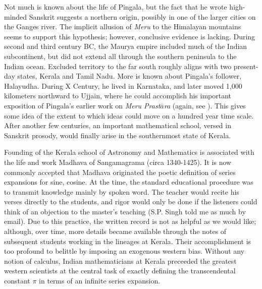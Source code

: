 \documentclass[nofootinbib,preprint]{revtex4-1}
\begin{document}
Not much is known about the life of Pingala, but the fact that he wrote high-minded Sanskrit suggests 
a northern origin, possibly in one of the larger cities on the Ganges river. The implicit
allusion of \textit{Meru} to the Himalayan mountains seems to support this hypothesis; however, 
conclusive evidence is lacking. During second and third century BC, the Maurya empire included 
much of the Indian subcontinent, but did not extend all through the southern peninsula to the 
Indian ocean. Excluded territory to the far south roughly aligns with two present-day states, 
Kerala and Tamil Nadu. More is known about Pingala's follower, Halayudha. During X Century, he 
lived in Karnataka, and later moved 1,000 kilometers northward to Ujjain, where he could accomplish 
his important exposition of Pingala's earlier work on \textit{Meru Prast$\bar{a}$ra} 
(again, see \cite{SINGH1936}). 
This gives  some idea of the extent to which ideas could move on a hundred year time scale. After another 
few centuries, an important mathematical school, versed in Sanskrit prosody, would finally 
arise in the southernmost state of Kerala.

Founding of the Kerala school of Astronomy and Mathematics is associated with the life and
work Madhava of Sangamagrama (circa 1340-1425). It is now commonly accepted that Madhava originated 
the poetic definition of series expansions for sine, cosine\cite{ROY1990}. At the time, the
standard educational procedure was to transmit knowledge mainly by spoken word. The teacher would
recite his verses directly to the students, and rigor would only be done if the listeners 
could think of an objection to the master's teaching (S.P. Singh told me as much by email). 
Due to this practice, the written record is not as helpful as we would like; although, over time, 
more details became available through the notes of subsequent students working in the lineages at 
Kerala\cite{MADHAVAVID}. Their accomplishment is too profound to belittle by imposing an exogenous 
western bias. Without any notion of calculus, Indian mathematicians at Kerala preceeded the greatest 
western scientists at the central task of exactly defining the transcendental constant $\pi$ in 
terms of an infinite series expansion\cite{ROY1990}.
\end{document}

